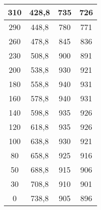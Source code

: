 \begin{table}[h!]
\begin{tabular}{|c|c|c|c|}
    310                              & 428,8            & 735     & 726       \\ \hline
    290                              & 448,8            & 780     & 771       \\ \hline
    260                              & 478,8            & 845     & 836       \\ \hline
    230                              & 508,8            & 900     & 891       \\ \hline
    200                              & 538,8            & 930     & 921       \\ \hline
    180                              & 558,8            & 940     & 931       \\ \hline
    160                              & 578,8            & 940     & 931       \\ \hline
    140                              & 598,8            & 935     & 926       \\ \hline
    120                              & 618,8            & 935     & 926       \\ \hline
    100                              & 638,8            & 930     & 921       \\ \hline
    80                               & 658,8            & 925     & 916       \\ \hline
    50                               & 688,8            & 915     & 906       \\ \hline
    30                               & 708,8            & 910     & 901       \\ \hline
    0                                & 738,8            & 905     & 896       \\ \hline
    \end{tabular}
    \centering
    \caption{}
    \label{table:exp1}
\end{table}